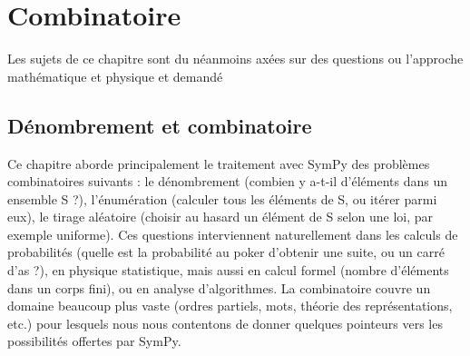\part{Combinatoire}

Les sujets de ce chapitre sont du néanmoins axées sur des questions ou l'approche mathématique et 
physique et demandé 

\chapter{Dénombrement et combinatoire}
Ce chapitre aborde principalement le traitement avec SymPy des problèmes
combinatoires suivants : le dénombrement (combien y a-t-il d’éléments dans un
ensemble S ?), l’énumération (calculer tous les éléments de S, ou itérer parmi
eux), le tirage aléatoire (choisir au hasard un élément de S selon une loi, par
exemple uniforme). Ces questions interviennent naturellement dans les calculs de
probabilités (quelle est la probabilité au poker d’obtenir une suite, ou un carré
d’as ?), en physique statistique, mais aussi en calcul formel (nombre d’éléments
dans un corps fini), ou en analyse d’algorithmes. La combinatoire couvre un
domaine beaucoup plus vaste (ordres partiels, mots, théorie des représentations,
etc.) pour lesquels nous nous contentons de donner quelques pointeurs vers les
possibilités offertes par SymPy.
 
